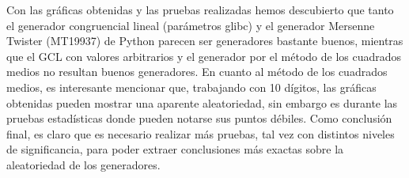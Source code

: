 Con las gráficas obtenidas y las pruebas realizadas hemos descubierto que tanto el generador congruencial lineal (parámetros glibc) y el generador Mersenne Twister (MT19937) de Python parecen ser generadores bastante buenos, mientras que el GCL con valores arbitrarios y el generador por el método de los cuadrados medios no resultan buenos generadores. En cuanto al método de los cuadrados medios, es interesante mencionar que, trabajando con 10 dígitos, las gráficas obtenidas pueden mostrar una aparente aleatoriedad, sin embargo es durante las pruebas estadísticas donde pueden notarse sus puntos débiles. Como conclusión final, es claro que es necesario realizar más pruebas, tal vez con distintos niveles de significancia, para poder extraer conclusiones más exactas sobre la aleatoriedad de los generadores.
